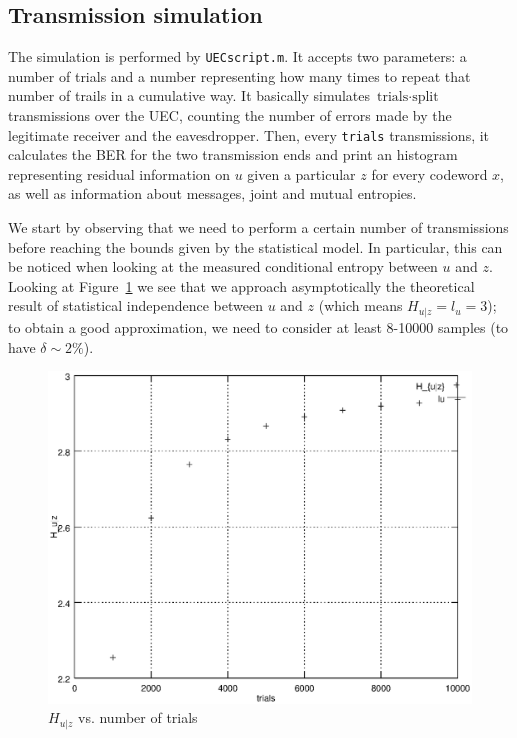 \documentclass[a4paper,12pt,titlepage]{article}
\begin{document}
\subsection*{Transmission simulation}
The simulation is performed by \texttt{UECscript.m}. It accepts two parameters:
a number of trials and a number representing how many times to repeat that
number of trails in a cumulative way. It basically simulates
$\text{trials} \cdot \text{split}$ transmissions over the UEC, counting the number of errors made by
the legitimate receiver and the eavesdropper. Then, every \texttt{trials}
transmissions, it calculates the BER for
the two transmission ends and print an histogram representing residual information
on $u$ given a particular $z$ for every codeword $x$, as well as
information about messages, joint and mutual entropies.

We start by observing that we need to perform a certain number of transmissions
before reaching the bounds given by the statistical model. In particular, this
can be noticed when looking at the measured conditional entropy between $u$ and
$z$. Looking at Figure~\ref{fig:uec_Hudz} we see that we approach asymptotically the
theoretical result of statistical independence between $u$ and $z$ (which means
$H_{u|z} = l_u = 3$); to obtain a good approximation, we need to consider at
least 8-10000 samples (to have $\delta \sim 2\%$). \\
\begin{figure}[h]
  \centering
  \includegraphics[scale=0.8]{uec_Hudz.eps}
  \caption{$H_{u|z}$ vs. number of trials}
  \label{fig:uec_Hudz}
\end{figure}
\end{document}
